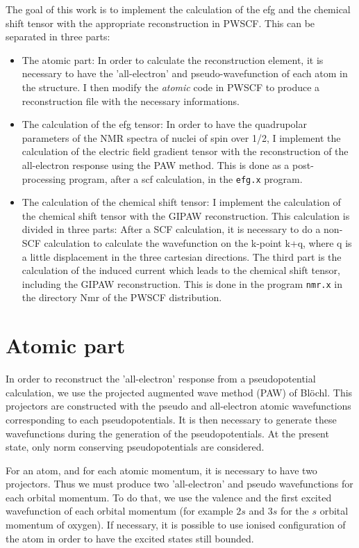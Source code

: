 \documentclass[11pt, a4paper]{article}
\begin{document}
The goal of this work is to implement the calculation of the efg and
the chemical shift tensor with the appropriate reconstruction in
PWSCF. This can be separated in three parts:
\begin{itemize}
\item The atomic part: In order to calculate the reconstruction
element, it is necessary to have the 'all-electron' and
pseudo-wavefunction of each atom in the structure. I then modify the
{\it atomic} code in PWSCF to produce a reconstruction file with the
necessary informations.
\item The calculation of the efg tensor: In order to have the
quadrupolar parameters of the NMR spectra of nuclei of spin over 1/2,
I implement the calculation of the electric field gradient tensor with
the reconstruction of the all-electron response using the PAW
method. This is done as a post-processing program, after a scf
calculation, in the \verb+efg.x+ program.
\item The calculation of the chemical shift tensor: I implement the
calculation of the chemical shift tensor with the GIPAW
reconstruction. This calculation is divided in three parts: After a
SCF calculation, it is necessary to do a non-SCF calculation to
calculate the wavefunction on the k-point k+q, where q is a little
displacement in the three cartesian directions. The third part is the
calculation of the induced current which leads to the chemical shift
tensor, including the GIPAW reconstruction. This is done in the
program \verb+nmr.x+ in the directory Nmr of the PWSCF distribution.
\end{itemize}

\section{Atomic part}

In order to reconstruct the 'all-electron' response from a
pseudopotential calculation, we use the projected augmented wave
method (PAW) of Bl\"ochl. This projectors are constructed with the
pseudo and all-electron atomic wavefunctions corresponding to each
pseudopotentials. It is then necessary to generate these wavefunctions
during the generation of the pseudopotentials.  At the present state,
only norm conserving pseudopotentials are considered.

For an atom, and for each atomic momentum, it is necessary to have two
projectors. Thus we must produce two 'all-electron' and pseudo
wavefunctions for each orbital momentum. To do that, we use the
valence and the first excited wavefunction of each orbital momentum
(for example $2s$ and $3s$ for the $s$ orbital momentum of oxygen). If
necessary, it is possible to use ionised configuration of the atom in
order to have the excited states still bounded.
\end{document}
